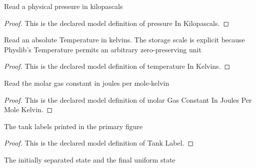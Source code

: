 \begin{definition}
  \label{def:physics:phyx-mini-0400:phyxminiproblems-problemphyxmini0400-pressureinkilopascals}
  Read a physical pressure in kilopascals
\end{definition}
\begin{proof}
  This is the declared model definition of pressure In Kilopascals.
\end{proof}
\begin{definition}
  \label{def:physics:phyx-mini-0400:phyxminiproblems-problemphyxmini0400-temperatureinkelvins}
  Read an absolute Temperature in kelvins. The storage scale is explicit because Physlib's Temperature permits an arbitrary zero-preserving unit
\end{definition}
\begin{proof}
  This is the declared model definition of temperature In Kelvins.
\end{proof}
\begin{definition}
  \label{def:physics:phyx-mini-0400:phyxminiproblems-problemphyxmini0400-molargasconstantinjoulespermolekelvin}
  Read the molar gas constant in joules per mole-kelvin
\end{definition}
\begin{proof}
  This is the declared model definition of molar Gas Constant In Joules Per Mole Kelvin.
\end{proof}
\begin{definition}
  \label{def:physics:phyx-mini-0400:phyxminiproblems-problemphyxmini0400-tanklabel}
  The tank labels printed in the primary figure
\end{definition}
\begin{proof}
  This is the declared model definition of Tank Label.
\end{proof}
\begin{definition}
  \label{def:physics:phyx-mini-0400:phyxminiproblems-problemphyxmini0400-processstage}
  The initially separated state and the final uniform state
\end{definition}
